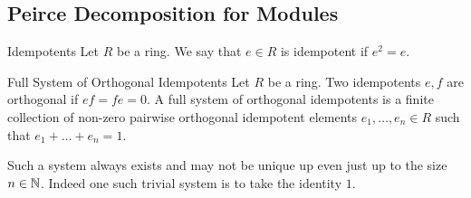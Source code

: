 \documentclass[a4paper]{article}
\begin{document}
\subsection{Peirce Decomposition for Modules}
\begin{defn}{Idempotents}{} Let $R$ be a ring. We say that $e\in R$ is idempotent if $e^2=e$. 
\end{defn}

\begin{defn}{Full System of Orthogonal Idempotents}{} Let $R$ be a ring. Two idempotents $e,f$ are orthogonal if $ef=fe=0$. A full system of orthogonal idempotents is a finite collection of non-zero pairwise orthogonal idempotent elements $e_1,\dots,e_n\in R$ such that $e_1+\dots+e_n=1$. 
\end{defn}

Such a system always exists and may not be unique up even just up to the size $n\in\mathbb{N}$. Indeed one such trivial system is to take the identity $1$. 
\end{document}
